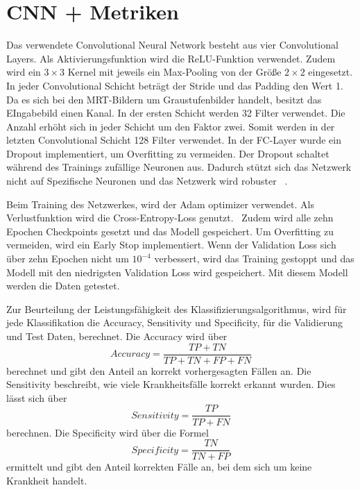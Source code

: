 \section{CNN + Metriken}

Das verwendete Convolutional Neural Network besteht aus vier Convolutional Layers. Als Aktivierungsfunktion wird die ReLU-Funktion verwendet.
Zudem wird ein $3 \times 3$ Kernel mit jeweils ein Max-Pooling von der Größe $2 \times 2$ eingesetzt. 
In jeder Convolutional Schicht beträgt der Stride und das Padding den Wert 1.
Da es sich bei den MRT-Bildern um Graustufenbilder handelt, besitzt das EIngabebild einen Kanal. 
In der ersten Schicht werden 32 Filter verwendet.
Die Anzahl erhöht sich in jeder Schicht um den Faktor zwei.
Somit werden in der letzten Convolutional Schicht 128 Filter verwendet.
In der FC-Layer wurde ein Dropout implementiert, um Overfitting zu vermeiden.
Der Dropout schaltet während des Trainings zufällige Neuronen aus.
Dadurch stützt sich das Netzwerk nicht auf Spezifische Neuronen und das Netzwerk wird robuster ~\cite{Yamashita2018}.

Beim Training des Netzwerkes, wird der Adam optimizer verwendet. 
Als Verlustfunktion wird die Cross-Entropy-Loss genutzt.~\cite{pytorchCrossEntropy}
Zudem wird alle zehn Epochen Checkpoints gesetzt und das Modell gespeichert.
Um Overfitting zu vermeiden, wird ein Early Stop implementiert. Wenn der Validation Loss sich über zehn Epochen nicht um $10^{-4}$
verbessert, wird das Training gestoppt und das Modell mit den niedrigsten Validation Loss wird gespeichert.
Mit diesem Modell werden die Daten getestet.

Zur Beurteilung der Leistungsfähigkeit des Klassifizierungsalgorithmus, wird für jede Klassifikation die Accuracy, 
Sensitivity und Specificity, für die Validierung und Test Daten, berechnet.
Die Accuracy wird über
\begin{equation}
  Accuracy = \frac{TP + TN}{TP + TN + FP + FN}
\end{equation}
berechnet und gibt den Anteil an korrekt vorhergesagten Fällen an. 
Die Sensitivity beschreibt, wie viele Krankheitsfälle korrekt erkannt wurden. Dies lässt sich über
\begin{equation}
  Sensitivity = \frac{TP}{TP + FN}
\end{equation}
berechnen.
Die Specificity wird über die Formel
\begin{equation}
  Specificity = \frac{TN}{TN + FP}
\end{equation}
ermittelt und gibt den Anteil korrekten Fälle an, bei dem sich um keine Krankheit handelt.%

